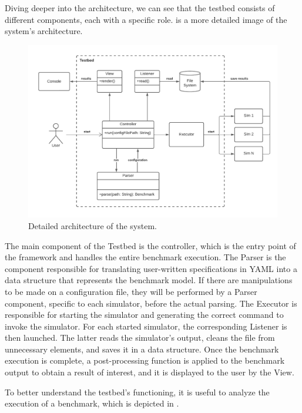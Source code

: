 \documentclass[12pt,a4paper,openright,twoside]{book}
\begin{document}
Diving deeper into the architecture, we can see that the testbed consists of different components, each with a specific role.
 is a more detailed image of the system's architecture.

\begin{figure}[h!]
  \centering
  \includegraphics[width=\textwidth]{figures/testbed-architecture.pdf}
  \caption{Detailed architecture of the system.}
  \label{fig:detailed-architecture}
\end{figure}

The main component of the Testbed is the controller, which is the entry point of the framework and handles the entire benchmark execution.
The Parser is the component responsible for translating user-written specifications in YAML into a data structure that represents the benchmark model.
If there are manipulations to be made on a configuration file, they will be performed by a Parser component, specific to each simulator, before the actual parsing.
The Executor is responsible for starting the simulator and generating the correct command to invoke the simulator.
For each started simulator, the corresponding Listener is then launched. 
The latter reads the simulator's output, cleans the file from unnecessary elements, and saves it in a data structure.
Once the benchmark execution is complete, a post-processing function is applied to the benchmark output to obtain a result of interest, and it is displayed to the user by the View.

To better understand the testbed's functioning, it is useful to analyze the execution of a benchmark, which is depicted in .
\end{document}
